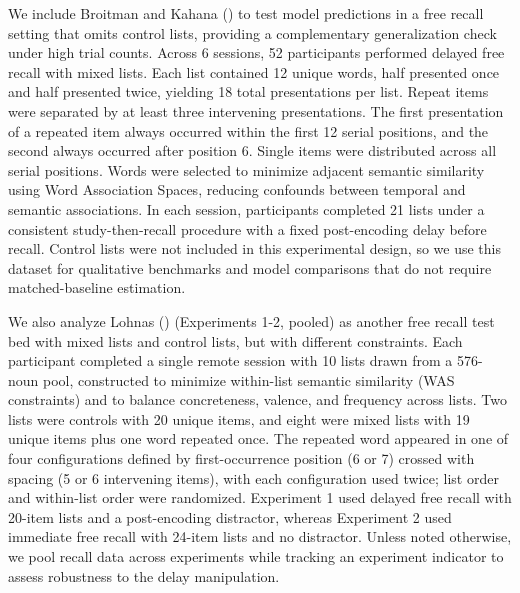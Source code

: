 \documentclass[
  man,
  floatsintext,
  longtable,
  nolmodern,
  notxfonts,
  notimes,
  draftfirst,
  colorlinks=true,linkcolor=blue,citecolor=blue,urlcolor=blue]{apa7}
\begin{document}
We include Broitman and Kahana ()
to test model predictions in a free recall setting that omits control
lists, providing a complementary generalization check under high trial
counts. Across 6 sessions, 52 participants performed delayed free recall
with mixed lists. Each list contained 12 unique words, half presented
once and half presented twice, yielding 18 total presentations per list.
Repeat items were separated by at least three intervening presentations.
The first presentation of a repeated item always occurred within the
first 12 serial positions, and the second always occurred after position
6. Single items were distributed across all serial positions. Words were
selected to minimize adjacent semantic similarity using Word Association
Spaces, reducing confounds between temporal and semantic associations.
In each session, participants completed 21 lists under a consistent
study-then-recall procedure with a fixed post-encoding delay before
recall. Control lists were not included in this experimental design, so
we use this dataset for qualitative benchmarks and model comparisons
that do not require matched-baseline estimation.

We also analyze Lohnas ()
(Experiments 1-2, pooled) as another free recall test bed with mixed
lists and control lists, but with different constraints. Each
participant completed a single remote session with 10 lists drawn from a
576-noun pool, constructed to minimize within-list semantic similarity
(WAS constraints) and to balance concreteness, valence, and frequency
across lists. Two lists were controls with 20 unique items, and eight
were mixed lists with 19 unique items plus one word repeated once. The
repeated word appeared in one of four configurations defined by
first-occurrence position (6 or 7) crossed with spacing (5 or 6
intervening items), with each configuration used twice; list order and
within-list order were randomized. Experiment 1 used delayed free recall
with 20-item lists and a post-encoding distractor, whereas Experiment 2
used immediate free recall with 24-item lists and no distractor. Unless
noted otherwise, we pool recall data across experiments while tracking
an experiment indicator to assess robustness to the delay manipulation.
\end{document}
